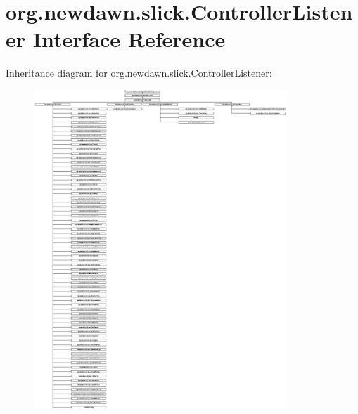 \hypertarget{interfaceorg_1_1newdawn_1_1slick_1_1_controller_listener}{}\section{org.\+newdawn.\+slick.\+Controller\+Listener Interface Reference}
\label{interfaceorg_1_1newdawn_1_1slick_1_1_controller_listener}
Inheritance diagram for org.\+newdawn.\+slick.\+Controller\+Listener\+:\begin{figure}[H]
\begin{center}
\leavevmode
\includegraphics[height=12.000000cm]{interfaceorg_1_1newdawn_1_1slick_1_1_controller_listener}
\end{center}
\end{figure}
